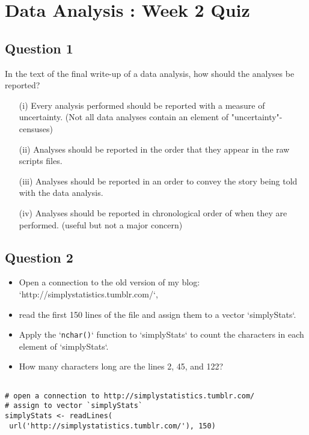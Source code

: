 \documentclass[]{article}
\begin{document}
\section{Data Analysis : Week 2 Quiz}


\subsection*{Question 1}

In the text of the final write-up of a data analysis, how should the analyses be reported?

\begin{itemize} 
\item[(i)] Every analysis performed should be reported with a measure of uncertainty. (Not all data analyses contain an element of "uncertainty"- censuses)
\item[(ii)] Analyses should be reported in the order that they appear in the raw scripts files.
\item[(iii)] Analyses should be reported in an order to convey the story being told with the data analysis.
\item[(iv)] Analyses should be reported in chronological order of when they are performed. (useful but not a major concern)
\end{itemize}


\newpage
\subsection*{Question 2}

\begin{itemize}
\item Open a connection to the old version of my blog: `http://simplystatistics.tumblr.com/`, 
\item read the first 150 lines of the file and assign them to a vector `simplyStats`. 
\item Apply the `\texttt{nchar()}` function to `simplyStats` to count the characters in each element of `simplyStats`. 
\item How many characters long are the lines 2, 45, and 122?
\end{itemize}


\begin{framed}
\begin{verbatim}

# open a connection to http://simplystatistics.tumblr.com/ 
# assign to vector `simplyStats`
simplyStats <- readLines( 
 url('http://simplystatistics.tumblr.com/'), 150)
\end{verbatim}
\end{framed}
\end{document}
